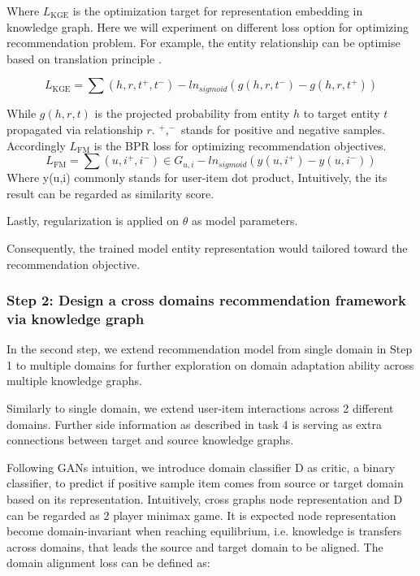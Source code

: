 Where $L_\text{KGE}$ is the optimization target for representation embedding in knowledge graph. Here we will experiment on different loss option for optimizing recommendation problem. For example, the entity relationship can be optimise based on translation principle \citep{lin2017learning}. 

\begin{equation}
    L_\text{KGE}=\sum{(h,r,t^+,t^-)} -ln_{sigmoid}(g(h,r,t^-)-g(h,r,t^+))
\end{equation}

While $g(h,r,t)$ is the projected probability from entity $h$ to target entity $t$ propagated via relationship $r$. $^+,^-$ stands for positive and negative samples. Accordingly $L_\text{FM}$ is the BPR \citep{rendle2012bpr} loss for optimizing recommendation objectives. 
\begin{equation}
    L_\text{FM}=\sum{(u,i^+,i^-) \in G_{u,i}} -ln_{sigmoid}(y(u,i^+)-y(u,i^-))
\end{equation}
Where y(u,i) commonly stands for user-item dot product, Intuitively, the its result can be regarded as similarity score.

Lastly, regularization is applied on $\theta$ as model parameters.

Consequently, the trained model entity representation would tailored toward the recommendation objective.


\subsubsection*{Step 2: Design a cross domains recommendation framework via knowledge graph}

In the second step, we extend recommendation model from single domain in Step 1 to multiple domains for further exploration on domain adaptation ability across multiple knowledge graphs.

Similarly to single domain, we extend user-item interactions across 2 different domains. Further side information as described in task 4 is serving as extra connections between target and source knowledge graphs.

Following GANs intuition, we introduce domain classifier D as critic, a binary classifier, to predict if positive sample item comes from source or target domain based on its representation. Intuitively, cross graphs node representation and D can be regarded as 2 player minimax game. It is expected node representation become domain-invariant when reaching equilibrium, i.e. knowledge is transfers across domains, that leads the source and target domain to be aligned. The domain alignment loss can be defined as:

